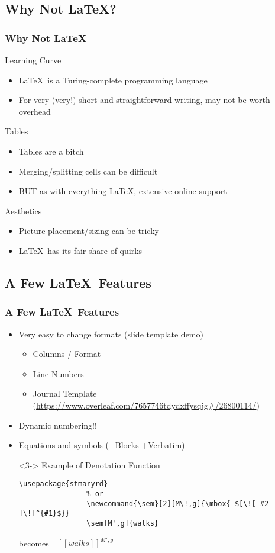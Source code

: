 \documentclass[xcolor={svgnames},
hyperref={colorlinks,citecolor=DeepPink4,linkcolor=DarkRed,urlcolor=DarkBlue}
]{beamer}
\newcommand{\sem}[2][M\!,g]{\mbox{ $[\![ #2 ]\!]^{#1}$}}
\begin{document}
	\subsection{Why Not \LaTeX?}
	\begin{frame}
		\frametitle{Why Not \LaTeX}
		Learning Curve
		\begin{itemize}
			\item <2-> \LaTeX\ is a Turing-complete programming language
			\item <3-> For very (very!) short and straightforward writing, may not be worth overhead
		\end{itemize}
		Tables
		\begin{itemize}
			\item <4-> Tables are a bitch
			\item <5-> Merging/splitting cells can be difficult
			\item <6-> BUT as with everything \LaTeX, extensive online support
		\end{itemize}
		Aesthetics
		\begin{itemize}
			\item <7-> Picture placement/sizing can be tricky
			\item <8-> \LaTeX\ has its fair share of quirks
		\end{itemize}
	\end{frame}
	
	\subsection{A Few \LaTeX\ Features}
	\begin{frame}[fragile]
		\frametitle{A Few \LaTeX\ Features}
		\begin{itemize}
			\item Very easy to change formats (slide template demo)
			\begin{itemize}
				\item Columns / Format
				\item Line Numbers
				\item Journal Template 		 (\url{https://www.overleaf.com/7657746tdydxffysqjg\#/26800114/})
			\end{itemize}
			\item <2-> Dynamic numbering!!
			\item <3-> Equations and symbols (+Blocks +Verbatim)
			
			\begin{block}<3-> {Example of Denotation Function}
				\begin{Verbatim}[fontsize=\small]
				\usepackage{stmaryrd}
				% or 
				\newcommand{\sem}[2][M\!,g]{\mbox{ $[\![ #2 ]\!]^{#1}$}}
				\sem[M',g]{walks}
				\end{Verbatim}
			\end{block}
			becomes
			$\sem[M',g]{walks}$
		\end{itemize}
	\end{frame}
	
\end{document}
